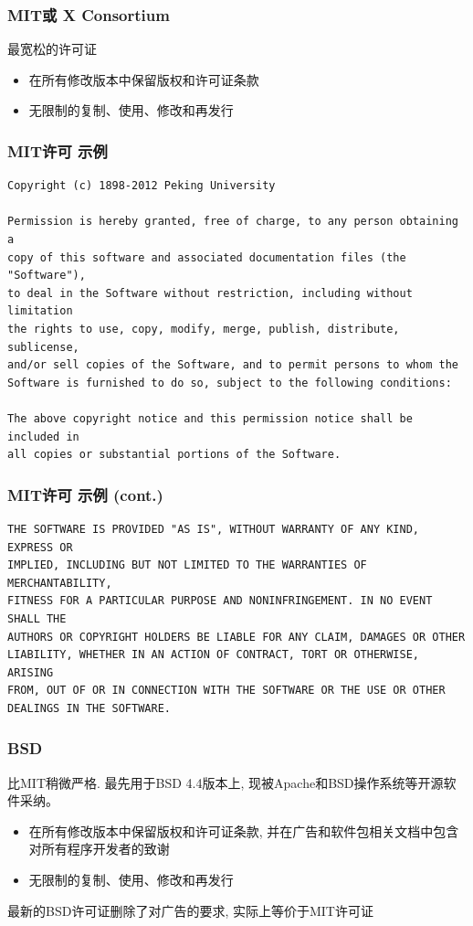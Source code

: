\documentclass[compress]{beamer}
\begin{document}
\begin{frame}
\frametitle{MIT或 X Consortium}
最宽松的许可证
\begin{itemize}
\item 在所有修改版本中保留版权和许可证条款
\item 无限制的复制、使用、修改和再发行
\end{itemize}

\end{frame}

\begin{frame}[fragile]
\frametitle{MIT许可 示例}
\scriptsize
\begin{verbatim}
Copyright (c) 1898-2012 Peking University

Permission is hereby granted, free of charge, to any person obtaining a 
copy of this software and associated documentation files (the "Software"), 
to deal in the Software without restriction, including without limitation 
the rights to use, copy, modify, merge, publish, distribute, sublicense, 
and/or sell copies of the Software, and to permit persons to whom the 
Software is furnished to do so, subject to the following conditions:

The above copyright notice and this permission notice shall be included in 
all copies or substantial portions of the Software.
\end{verbatim}
\end{frame}

\begin{frame}[fragile]
\frametitle{MIT许可 示例 (cont.)}
\scriptsize
\begin{verbatim}
THE SOFTWARE IS PROVIDED "AS IS", WITHOUT WARRANTY OF ANY KIND, EXPRESS OR 
IMPLIED, INCLUDING BUT NOT LIMITED TO THE WARRANTIES OF MERCHANTABILITY, 
FITNESS FOR A PARTICULAR PURPOSE AND NONINFRINGEMENT. IN NO EVENT SHALL THE
AUTHORS OR COPYRIGHT HOLDERS BE LIABLE FOR ANY CLAIM, DAMAGES OR OTHER 
LIABILITY, WHETHER IN AN ACTION OF CONTRACT, TORT OR OTHERWISE, ARISING 
FROM, OUT OF OR IN CONNECTION WITH THE SOFTWARE OR THE USE OR OTHER 
DEALINGS IN THE SOFTWARE.
\end{verbatim}

\end{frame}


\begin{frame}
\frametitle{BSD}
比MIT稍微严格. 最先用于BSD 4.4版本上, 现被Apache和BSD操作系统等开源软件采纳。
\begin{itemize}
\item 在所有修改版本中保留版权和许可证条款, 并在广告和软件包相关文档中包含对所有程序开发者的致谢
\item 无限制的复制、使用、修改和再发行
\end{itemize}
最新的BSD许可证删除了对广告的要求, 实际上等价于MIT许可证

\end{frame}
\end{document}

